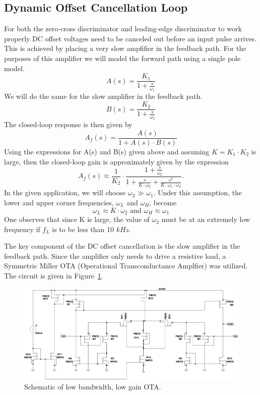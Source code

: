 \documentclass[12pt,oneside,final]{siuethesis}
\theoremstyle{definition}
\begin{document}
\subsection{Dynamic Offset Cancellation Loop}
\par For both the zero-cross discriminator and leading-edge discriminator to work properly DC offset voltages need to be canceled out before an input pulse arrives. This is achieved by placing a very slow ampfifier in the feedback path.  For the purposes of this amplifier we will model the forward path using a single pole model.
\begin{equation}
A(s) = \frac{K_1}{1 + \frac{s}{\omega_1}}
\end{equation}
We will do the same for the slow amplifier in the feedback path.
\begin{equation}
B(s) = \frac{K_2}{1 + \frac{s}{\omega_2}}
\end{equation}
The closed-loop response is then given by 
\begin{equation}
A_f(s) = \frac{A(s)}{1 + A(s) \cdot B(s)} 
\end{equation}
Using the expressions for A(s) and B(s) given above and assuming $K = K_1 \cdot K_2$ is large, then the closed-loop gain is approximately given by the expression 
\begin{equation}
A_f(s) \approx \frac{1}{K_2} \cdot \frac{1 + \frac{s}{\omega_2}}{1 + \frac{s}{K \cdot \omega_2} + \frac{s^2}{K \cdot \omega_1 \cdot \omega_2}}.
\end{equation}
In the given application, we will choose $\omega_2 \gg \omega_1$.  Under this assumption, the lower and upper corner frequencies, $\omega_L$ and $\omega_H$, become
\begin{equation}
\omega_L \approx K \cdot \omega_2 \text{ and } \omega_H \approx  \omega_1
\end{equation}
One observes that since K is large, the value of $\omega_2$ must be at an extremely low frequency if $f_L$ is to be less than 10 $kHz$.
\par The key component of the DC offset cancellation is the slow amplifier in the feedback path. Since the amplifier only needs to drive a resistive load, a Symmetric Miller OTA (Operational Transconductance Amplfier) was utilized.  The circuit is given in Figure~\ref{fig:slowota}.

\begin{figure}[htbp!]
	\centering
 	\includegraphics[scale=0.8,keepaspectratio=true, angle=90]{../Design_Reports/CFD_circuit_report/images/small_gm_ota.pdf}
 	\caption{Schematic of low bandwidth, low gain OTA.}
 	\label{fig:slowota}
\end{figure}
\end{document}
